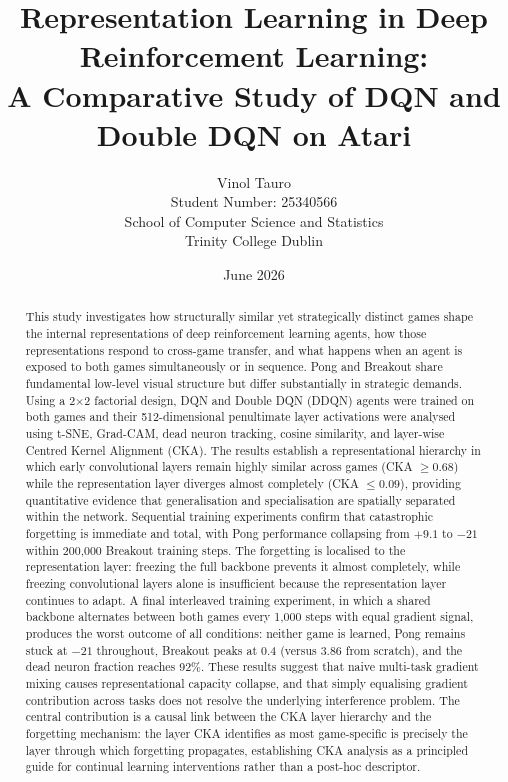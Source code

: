 \documentclass[a4paper]{article}
\begin{document}
\title{\textbf{Representation Learning in Deep Reinforcement Learning:}\\
       \large A Comparative Study of DQN and Double DQN on Atari}
\author{Vinol Tauro\\
        \small Student Number: 25340566\\
        \small School of Computer Science and Statistics\\
        \small Trinity College Dublin}
\date{June 2026}
\maketitle

\begin{abstract}
This study investigates how structurally similar yet strategically distinct games shape
the internal representations of deep reinforcement learning agents, how those representations
respond to cross-game transfer, and what happens when an agent is exposed to both games
simultaneously or in sequence. Pong and Breakout share fundamental low-level visual
structure but differ substantially in strategic demands. Using a 2$\times$2 factorial
design, DQN and Double DQN (DDQN) agents were trained on both games and their
512-dimensional penultimate layer activations were analysed using t-SNE, Grad-CAM,
dead neuron tracking, cosine similarity, and layer-wise Centred Kernel Alignment (CKA).
The results establish a representational hierarchy in which early convolutional layers
remain highly similar across games (CKA $\geq 0.68$) while the representation layer
diverges almost completely (CKA $\leq 0.09$), providing quantitative evidence that
generalisation and specialisation are spatially separated within the network. Sequential
training experiments confirm that catastrophic forgetting is immediate and total, with
Pong performance collapsing from $+9.1$ to $-21$ within 200,000 Breakout training steps.
The forgetting is localised to the representation layer: freezing the full backbone
prevents it almost completely, while freezing convolutional layers alone is insufficient
because the representation layer continues to adapt. A final interleaved training
experiment, in which a shared backbone alternates between both games every 1,000 steps
with equal gradient signal, produces the worst outcome of all conditions: neither game
is learned, Pong remains stuck at $-21$ throughout, Breakout peaks at 0.4 (versus 3.86
from scratch), and the dead neuron fraction reaches 92\%. These results suggest that
naive multi-task gradient mixing causes representational capacity collapse, and that
simply equalising gradient contribution across tasks does not resolve the underlying
interference problem. The central contribution is a causal link between the CKA layer
hierarchy and the forgetting mechanism: the layer CKA identifies as most game-specific
is precisely the layer through which forgetting propagates, establishing CKA analysis as
a principled guide for continual learning interventions rather than a post-hoc descriptor.
\end{abstract}
\end{document}
